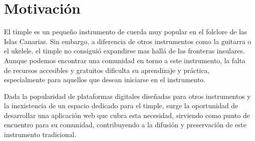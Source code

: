 \section{Motivación}
El timple es un pequeño instrumento de cuerda muy popular en el folclore de las Islas Canarias. Sin embargo, a diferencia de otros instrumentos como la guitarra o el ukelele, el timple no consiguió expandirse mas hallá de las fronteras insulares. Aunque podemos encontrar una comunidad en torno a este instrumento, la falta de recursos accesibles y gratuitos dificulta su aprendizaje y práctica, especialmente para aquellos que desean iniciarse en el instrumento.

Dada la popularidad de plataformas digitales diseñadas para otros instrumentos y la inexistencia de un espacio dedicado para el timple, surge la oportunidad de desarrollar una aplicación web que cubra esta necesidad, sirviendo como punto de encuentro para su comunidad, contribuyendo a la difusión y preservación de este instrumento tradicional.